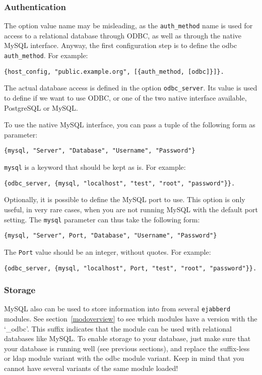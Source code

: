 \documentclass[a4paper,10pt]{book}
\newcommand{\ind}[1]{\begin{latexonly}\index{#1}\end{latexonly}}
\newcommand{\term}[1]{\texttt{#1}}
\newcommand{\ejabberd}{\texttt{ejabberd}}
\begin{document}
\subsubsection{Authentication}
\label{mysqlauth}
\ind{MySQL!authentication}

The option value name may be misleading, as the \term{auth\_method} name is used
for access to a relational database through ODBC, as well as through the native
MySQL interface. Anyway, the first configuration step is to define the odbc
\term{auth\_method}. For example:
\begin{verbatim}
{host_config, "public.example.org", [{auth_method, [odbc]}]}.
\end{verbatim}

The actual database access is defined in the option \term{odbc\_server}. Its
value is used to define if we want to use ODBC, or one of the two native
interface available, PostgreSQL or MySQL.

To use the native MySQL interface, you can pass a tuple of the following form as
parameter:
\begin{verbatim}
{mysql, "Server", "Database", "Username", "Password"}
\end{verbatim}

\term{mysql} is a keyword that should be kept as is. For example:
\begin{verbatim}
{odbc_server, {mysql, "localhost", "test", "root", "password"}}.
\end{verbatim}

Optionally, it is possible to define the MySQL port to use. This
option is only useful, in very rare cases, when you are not running
MySQL with the default port setting. The \term{mysql} parameter
can thus take the following form:
\begin{verbatim}
{mysql, "Server", Port, "Database", "Username", "Password"}
\end{verbatim}

The \term{Port} value should be an integer, without quotes. For example:
\begin{verbatim}
{odbc_server, {mysql, "localhost", Port, "test", "root", "password"}}.
\end{verbatim}


\subsubsection{Storage}
\label{mysqlstorage}
\ind{MySQL!storage}

MySQL also can be used to store information into from several \ejabberd{}
modules. See section~\ref{modoverview} to see which modules have a version
with the `\_odbc'. This suffix indicates that the module can be used with
relational databases like MySQL. To enable storage to your database, just make
sure that your database is running well (see previous sections), and replace the
suffix-less or ldap module variant with the odbc module variant. Keep in mind
that you cannot have several variants of the same module loaded!
\end{document}
